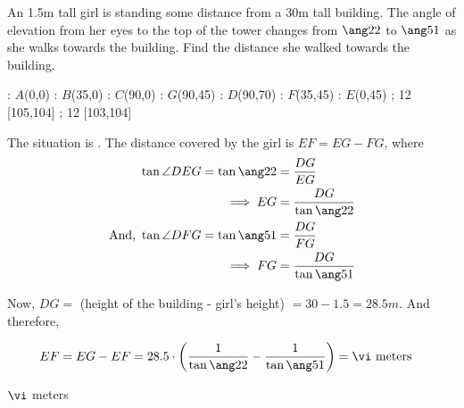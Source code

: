 

\DEGREESCOT\va\vc
\DEGREESCOT\vb\vd
\ROUND[2]\vc\ve
\ROUND[2]\vd\vf

\SUBTRACT\ve\vf\vg
\MULTIPLY{}\vh
\ROUND[2]\vh\vi

\question[3] An 1.5m tall girl is standing some distance from a 30m tall building.
The angle of elevation from her eyes to the top of the tower changes from $\ang\va$
to $\ang\vb$ as she walks towards the building. Find the distance she walked towards the building.

\watchout 


\ifprintanswers
  \begin{marginfigure}
      : $A$(0,0)
      : $B$(35,0)
      : $C$(90,0)
      : $G$(90,45)
      : $D$(90,70)
      : $F$(35,45)
      : $E$(0,45)
    \figdrawbegin{}
      \figdrawline [100,101,102,103,105,106,100]
      \figdrawline [101,105,104,106]
      \figdrawline [103,104]
       ; 12 [105,104] 
       ; 12 [103,104] 
    \figdrawend
    \centerline{\box\figBoxA}
  \end{marginfigure}
\fi 

\begin{solution}[\halfpage]
	The situation is \asif. The distance covered by the girl is $EF = EG - FG$, where
	\begin{align}
		\tan\angle{DEG} = \tan\ang\va &= \dfrac{DG}{EG} \\
		\implies EG &= \dfrac{DG}{\tan\ang\va} \\
		\text{And, }\tan\angle{DFG} = \tan\ang\vb &= \dfrac{DG}{FG} \\
		\implies FG &= \dfrac{DG}{\tan\ang\vb}
	\end{align}
	
	Now, $DG =$ (height of the building - girl's height) $= 30 - 1.5 = 28.5m$. And therefore, 
	
	\begin{align}
		EF = EG - EF &= 28.5\cdot\left(\dfrac{1}{\tan\ang\va} - \dfrac{1}{\tan\ang\vb}\right) = \vi\text{ meters}
	\end{align}
\end{solution}

\ifprintanswers\begin{codex}$\vi$ meters\end{codex}\fi
